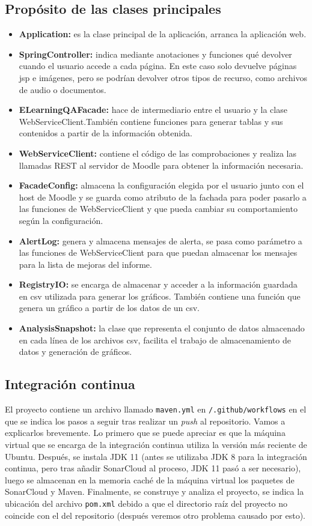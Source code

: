 \subsection{Propósito de las clases principales}
\begin{itemize}
	\item \textbf{Application:} es la clase principal de la aplicación, arranca la aplicación web.
	\item \textbf{SpringController:} indica mediante anotaciones y funciones qué devolver cuando el usuario accede a cada página. En este caso solo devuelve páginas jsp e imágenes, pero se podrían devolver otros tipos de recurso, como archivos de audio o documentos.
	\item \textbf{ELearningQAFacade:} hace de intermediario entre el usuario y la clase WebServiceClient.También contiene funciones para generar tablas y sus contenidos a partir de la información obtenida. 
	\item \textbf{WebServiceClient:} contiene el código de las comprobaciones y realiza las llamadas REST al servidor de Moodle para obtener la información necesaria.
	\item \textbf{FacadeConfig:} almacena la configuración elegida por el usuario junto con el host de Moodle y se guarda como atributo de la fachada para poder pasarlo a las funciones de WebServiceClient y que pueda cambiar su comportamiento según la configuración.
	\item \textbf{AlertLog:} genera y almacena mensajes de alerta, se pasa como parámetro a las funciones de WebServiceClient para que puedan almacenar los mensajes para la lista de mejoras del informe.
	\item \textbf{RegistryIO:} se encarga de almacenar y acceder a la información guardada en csv utilizada para generar los gráficos. También contiene una función que genera un gráfico a partir de los datos de un csv.
	\item \textbf{AnalysisSnapshot:} la clase que representa el conjunto de datos almacenado en cada línea de los archivos csv, facilita el trabajo de almacenamiento de datos y generación de gráficos.
\end{itemize}
\subsection{Integración continua}
El proyecto contiene un archivo llamado \texttt{maven.yml} en \texttt{/.github/workflows} en el que se indica los pasos a seguir tras realizar un \textit{push} al repositorio. Vamos a explicarlos brevemente. 
Lo primero que se puede apreciar es que la máquina virtual que se encarga de la integración continua utiliza la versión más reciente de Ubuntu. Después, se instala JDK 11 (antes se utilizaba JDK 8 para la integración continua, pero tras añadir SonarCloud al proceso, JDK 11 pasó a ser necesario), luego se almacenan en la memoria caché de la máquina virtual los paquetes de SonarCloud y Maven. Finalmente, se construye y analiza el proyecto, se indica la ubicación del archivo \texttt{pom.xml} debido a que el directorio raíz del proyecto no coincide con el del repositorio (después veremos otro problema causado por esto).
